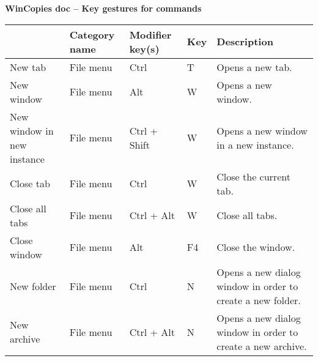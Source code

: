 \documentclass[12pt]{article}
\begin{document}
\begin{center}

\Huge

\textbf{WinCopies doc -- Key gestures for commands}

\end{center}

\renewcommand{\tabularxcolumn}[1]{>{\arraybackslash}m{#1}}

\keepXColumns 

\begin{tabularx}{\linewidth}{ | X | X | X!{+}X | X | }

\hline

  & Category name & Modifier key(s) & Key & Description \\

\hline

\endhead %

New tab & File menu & Ctrl & T & Opens a new tab. \\

\hline

New window & File menu & Alt & W & Opens a new window. \\

\hline

New window in new instance & File menu & Ctrl + Shift & W & Opens a new window in a new instance. \\

\hline

Close tab & File menu & Ctrl & W & Close the current tab. \\

\hline

Close all tabs & File menu & Ctrl + Alt & W & Close all tabs. \\

\hline

Close window & File menu & Alt & F4 & Close the window. \\

\hline

New folder & File menu & Ctrl & N & Opens a new dialog window in order to create a new folder. \\

\hline

New archive & File menu & Ctrl + Alt & N & Opens a new dialog window in order to create a new archive. \\


\end{tabularx}
\end{document}
